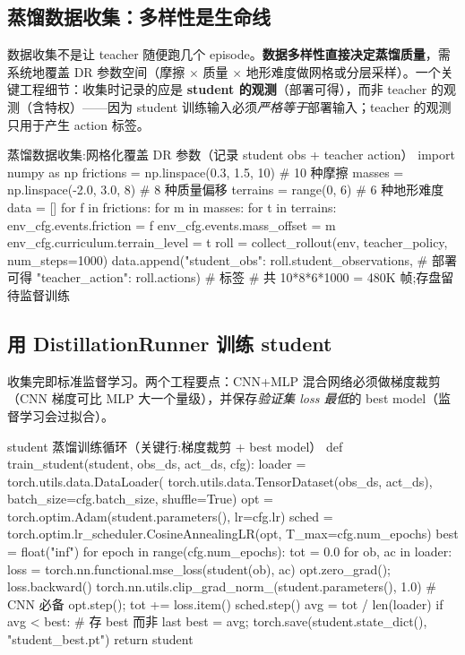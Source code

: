 \subsection{蒸馏数据收集：多样性是生命线}
\label{sec:rlmc-priv-collect}

数据收集不是让 teacher 随便跑几个 episode。\textbf{数据多样性直接决定蒸馏质量}，需系统地覆盖 DR 参数空间（摩擦 $\times$ 质量 $\times$ 地形难度做网格或分层采样）。一个关键工程细节：收集时记录的应是 \textbf{student 的观测}（部署可得），而非 teacher 的观测（含特权）——因为 student 训练输入必须\emph{严格等于}部署输入；teacher 的观测只用于产生 action 标签。

\begin{codebox}[Python]{蒸馏数据收集:网格化覆盖 DR 参数（记录 student obs + teacher action）}
import numpy as np
frictions = np.linspace(0.3, 1.5, 10)      # 10 种摩擦
masses    = np.linspace(-2.0, 3.0, 8)      # 8 种质量偏移
terrains  = range(0, 6)                     # 6 种地形难度
data = []
for f in frictions:
    for m in masses:
        for t in terrains:
            env_cfg.events.friction = f
            env_cfg.events.mass_offset = m
            env_cfg.curriculum.terrain_level = t
            roll = collect_rollout(env, teacher_policy, num_steps=1000)
            data.append({"student_obs":   roll.student_observations,  # 部署可得
                         "teacher_action": roll.actions})             # 标签
# 共 10*8*6*1000 = 480K 帧;存盘留待监督训练
\end{codebox}

\subsection{用 DistillationRunner 训练 student}
\label{sec:rlmc-priv-trainstudent}

收集完即标准监督学习。两个工程要点：CNN+MLP 混合网络必须做梯度裁剪（CNN 梯度可比 MLP 大一个量级），并保存\emph{验证集 loss 最低}的 best model（监督学习会过拟合）。

\begin{codebox}[Python]{student 蒸馏训练循环（关键行:梯度裁剪 + best model）}
def train_student(student, obs_ds, act_ds, cfg):
    loader = torch.utils.data.DataLoader(
        torch.utils.data.TensorDataset(obs_ds, act_ds),
        batch_size=cfg.batch_size, shuffle=True)
    opt = torch.optim.Adam(student.parameters(), lr=cfg.lr)
    sched = torch.optim.lr_scheduler.CosineAnnealingLR(opt, T_max=cfg.num_epochs)
    best = float("inf")
    for epoch in range(cfg.num_epochs):
        tot = 0.0
        for ob, ac in loader:
            loss = torch.nn.functional.mse_loss(student(ob), ac)
            opt.zero_grad(); loss.backward()
            torch.nn.utils.clip_grad_norm_(student.parameters(), 1.0)  # CNN 必备
            opt.step(); tot += loss.item()
        sched.step()
        avg = tot / len(loader)
        if avg < best:                                   # 存 best 而非 last
            best = avg; torch.save(student.state_dict(), "student_best.pt")
    return student
\end{codebox}

